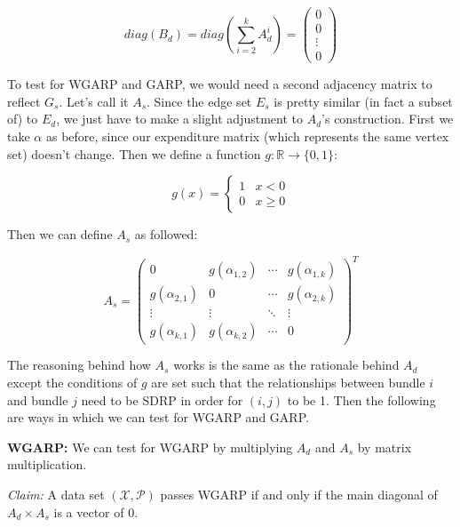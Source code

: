 \documentclass{article} %
\begin{document}
\[
diag(B_d) = diag(\sum_{i=2}^{k}A_d^i)=
 \begin{pmatrix}
  0 \\
  0 \\
  \vdots \\
  0
 \end{pmatrix}
\]

To test for WGARP and GARP, we would need a second adjacency matrix to reflect $G_s$. Let's call it $A_s$. Since the edge set $E_s$ is pretty similar (in fact a subset of) to $E_d$, we just have to make a slight adjustment to $A_d$'s construction. First we take $\alpha$ as before, since our expenditure matrix (which represents the same vertex set) doesn't change. Then we define a function $g:\mathbb{R}\to\{0,1\}$:

\[ 
g(x)=
    \begin{cases} 
      1 & x<0 \\
      0 & x\geq0
   \end{cases}
\]

Then we can define $A_s$ as followed:

\[
A_s =
 \begin{pmatrix}
  0 & g(\alpha_{1,2}) & \cdots & g(\alpha_{1,k}) \\
  g(\alpha_{2,1}) & 0 & \cdots & g(\alpha_{2,k}) \\
  \vdots  & \vdots  & \ddots & \vdots  \\
  g(\alpha_{k,1}) & g(\alpha_{k,2}) & \cdots & 0
 \end{pmatrix} ^T
\]

The reasoning behind how $A_s$ works is the same as the rationale behind $A_d$ except the conditions of $g$ are set such that the relationships between bundle $i$ and bundle $j$ need to be SDRP in order for $(i,j)$ to be 1. Then the following are ways in which we can test for WGARP and GARP.


\textbf{WGARP:} We can test for WGARP by multiplying $A_d$ and $A_s$ by matrix multiplication.


\textit{Claim:} A data set $(\mathcal{X}, \mathcal{P})$ passes WGARP if and only if the main diagonal of $A_d\times A_s$ is a vector of 0.
\end{document}
